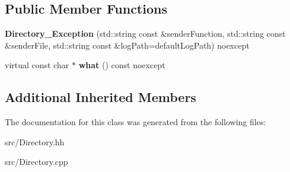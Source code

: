 \subsection*{Public Member Functions}
\begin{DoxyCompactItemize}
\item 
\hypertarget{classstb_1_1Directory__Exception_aab4de9c7daad5ee28d253d14b4672b6d}{{\bfseries Directory\+\_\+\+Exception} (std\+::string const \&sender\+Function, std\+::string const \&sender\+File, std\+::string const \&log\+Path=default\+Log\+Path) noexcept}\label{classstb_1_1Directory__Exception_aab4de9c7daad5ee28d253d14b4672b6d}

\item 
\hypertarget{classstb_1_1Directory__Exception_af904a57ba04098ee147e06cd5dc5b3c1}{virtual const char $\ast$ {\bfseries what} () const noexcept}\label{classstb_1_1Directory__Exception_af904a57ba04098ee147e06cd5dc5b3c1}

\end{DoxyCompactItemize}
\subsection*{Additional Inherited Members}


The documentation for this class was generated from the following files\+:\begin{DoxyCompactItemize}
\item 
src/Directory.\+hh\item 
src/Directory.\+cpp\end{DoxyCompactItemize}
